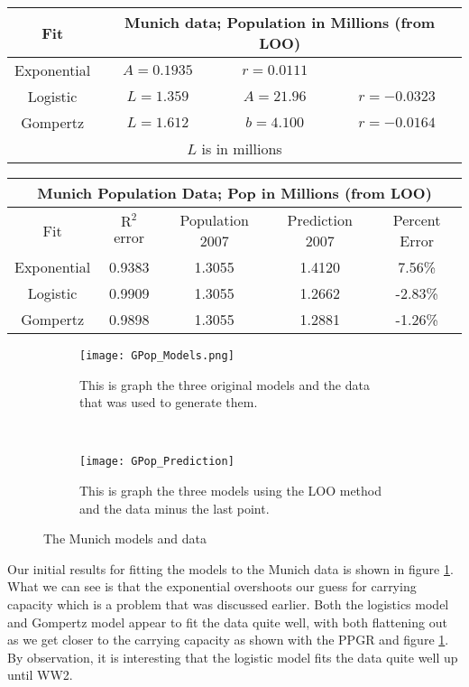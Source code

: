\documentclass[english]{article}
\begin{document}
\begin{center}
	\begin{tabular}{|c|c|c|c|}
		\hline Fit & \multicolumn{3}{|c|}{Munich data; Population in Millions (from LOO)}\\
		\hline
		Exponential & $ A=0.1935 $ & $ r=0.0111 $ & \\
		\hline
		Logistic & $ L= 1.359 $ & $ A=21.96 $ & $ r=-0.0323 $\\
		\hline
		Gompertz & $ L=1.612 $ & $ b=4.100 $ & $ r=-0.0164 $\\
		\hline
		\multicolumn{4}{|c|}{$ L $ is in millions}\\
		\hline
	\end{tabular}
	\begin{tabular}{|c|c|c|c|c|}
		\hline  \multicolumn{5}{|c|}{Munich Population Data; Pop in Millions (from LOO)}  \\ 
		\hline Fit & $ \text{R}^2 $ error & Population 2007 & Prediction 2007 & Percent Error \\ 
		\hline Exponential & 0.9383 & 1.3055 & 1.4120 & 7.56\% \\ 
		\hline Logistic & 0.9909 & 1.3055 & 1.2662 & -2.83\% \\ 
		\hline Gompertz & 0.9898 & 1.3055 & 1.2881 & -1.26\% \\ 
		\hline 
	\end{tabular} 
	\begin{figure}[h]
		\begin{subfigure}{.48\textwidth}
			\centering
			\texttt{[image: GPop\_Models.png]}
			\caption{\label{Gpop_model} This is graph the three original models and the data that was used to generate them.}
		\end{subfigure}%
		~
		\begin{subfigure}{.48\textwidth}
			\centering
			\texttt{[image: GPop\_Prediction]}
			\caption{\label{GPop_Prediction} This is graph the three models using the LOO method and the data minus the last point.}
		\end{subfigure}
		\caption{The Munich models and data}
	\end{figure}
\end{center}

Our initial results for fitting the models to the Munich data is shown in figure \ref{Gpop_model}. What we can see is that the exponential overshoots our guess for carrying capacity which is a problem that was discussed earlier. Both the logistics model and Gompertz model appear to fit the data quite well, with both flattening out as we get closer to the carrying capacity as shown with the PPGR and figure \ref{Gpop_model}. By observation, it is interesting that the logistic model fits the data quite well up until WW2.\\
\end{document}
